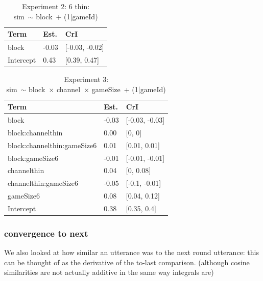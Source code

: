\documentclass[
  english,
  a4paper,
]{article}
\begin{document}
\begin{table}[h!]

\caption{\label{tab:unnamed-chunk-14}Experiment 2: 6 thin:\\ sim~$\sim$ block~+ (1|gameId)}
\centering
\begin{tabular}[t]{lll}
\toprule
Term & Est. & CrI\\
\midrule
block & -0.03 & {}[-0.03, -0.02]\\
Intercept & 0.43 & {}[0.39, 0.47]\\
\bottomrule
\end{tabular}
\end{table}

\begin{table}[h!]

\caption{\label{tab:unnamed-chunk-14}Experiment 3:\\ sim~$\sim$ block~$\times$ channel~$\times$ gameSize~+ (1|gameId)}
\centering
\begin{tabular}[t]{lll}
\toprule
Term & Est. & CrI\\
\midrule
block & -0.03 & {}[-0.03, -0.03]\\
block:channelthin & 0.00 & {}[0, 0]\\
block:channelthin:gameSize6 & 0.01 & {}[0.01, 0.01]\\
block:gameSize6 & -0.01 & {}[-0.01, -0.01]\\
channelthin & 0.04 & {}[0, 0.08]\\
\addlinespace
channelthin:gameSize6 & -0.05 & {}[-0.1, -0.01]\\
gameSize6 & 0.08 & {}[0.04, 0.12]\\
Intercept & 0.38 & {}[0.35, 0.4]\\
\bottomrule
\end{tabular}
\end{table}

\pagebreak

\hypertarget{convergence-to-next}{%
\subsubsection{convergence to next}\label{convergence-to-next}}

We also looked at how similar an utterance was to the next round utterance: this can be thought of as the derivative of the to-last comparison. (although cosine similarities are not actually additive in the same way integrals are)
\end{document}
